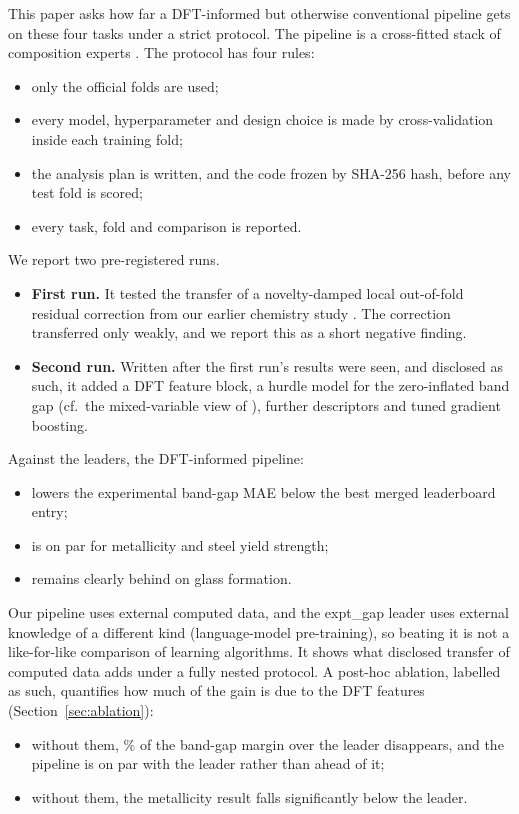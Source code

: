 This paper asks how far a DFT-informed but otherwise conventional pipeline gets on these four tasks under a strict protocol. The pipeline is a cross-fitted stack of composition experts \citep{wolpert1992stacked,breiman1996stacked,vanderlaan2007super}. The protocol has four rules:
\begin{itemize}
\item only the official folds are used;
\item every model, hyperparameter and design choice is made by cross-validation inside each training fold;
\item the analysis plan is written, and the code frozen by SHA-256 hash, before any test fold is scored;
\item every task, fold and comparison is reported.
\end{itemize}

We report two pre-registered runs.
\begin{itemize}
\item \textbf{First run.} It tested the transfer of a novelty-damped local out-of-fold residual correction from our earlier chemistry study \citep{gurram2026signet}. The correction transferred only weakly, and we report this as a short negative finding.
\item \textbf{Second run.} Written after the first run's results were seen, and disclosed as such, it added a DFT feature block, a hurdle model for the zero-inflated band gap (cf.\ the mixed-variable view of \citealp{ma2025gap}), further descriptors and tuned gradient boosting.
\end{itemize}

Against the leaders, the DFT-informed pipeline:
\begin{itemize}
\item lowers the experimental band-gap MAE below the best merged leaderboard entry;
\item is on par for metallicity and steel yield strength;
\item remains clearly behind on glass formation.
\end{itemize}
Our pipeline uses external computed data, and the expt\_gap leader uses external knowledge of a different kind (language-model pre-training), so beating it is not a like-for-like comparison of learning algorithms. It shows what disclosed transfer of computed data adds under a fully nested protocol.
A post-hoc ablation, labelled as such, quantifies how much of the gain is due to the DFT features (Section~\ref{sec:ablation}):
\begin{itemize}
\item without them, \AblNoDftGapShareOfLeaderGain\% of the band-gap margin over the leader disappears, and the pipeline is on par with the leader rather than ahead of it;
\item without them, the metallicity result falls significantly below the leader.
\end{itemize}
